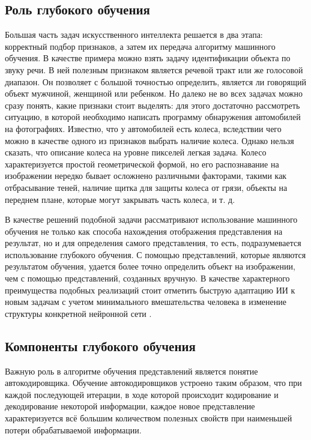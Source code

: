 \documentclass[bachelor, och, coursework]{SCWorks}
\begin{document}
    \subsection{Роль глубокого обучения}

        Большая часть задач искусственного интеллекта решается в два этапа: корректный подбор признаков, а затем их передача алгоритму машинного обучения. В качестве примера можно взять задачу идентификации объекта по звуку речи. В ней полезным признаком является речевой тракт или же голосовой диапазон. Он
        позволяет с большой точностью определить, является ли говорящий объект мужчиной, женщиной или
        ребенком.
        Но далеко не во всех задачах можно сразу понять, какие признаки стоит выделять: для этого достаточно рассмотреть ситуацию, в которой необходимо написать программу обнаружения автомобилей на фотографиях. Известно, что у автомобилей есть колеса, вследствии чего можно в качестве одного из признаков выбрать наличие колеса. Однако нельзя сказать, что описание колеса на уровне пикселей легкая задача.
        Колесо характеризуется простой геометрической формой, но его распознавание на изображении
        нередко бывает осложнено различными факторами, такими как отбрасывание теней, наличие щитка для защиты колеса от грязи, объекты на переднем плане, которые могут закрывать часть колеса, и т. д.

        В качестве решений подобной задачи рассматривают использование машинного обучения не только как способа нахождения отображения представления на результат, но и для определения самого представления, то есть, подразумевается использование глубокого обучения. С помощью представлений, которые являются результатом обучения, удается более точно определить объект на изображении, чем с помощью представлений, созданных вручную. В качестве характерного преимущества подобных реализаций стоит отметить быструю адаптацию ИИ к новым задачам с учетом минимального вмешательства человека в изменение структуры конкретной нейронной сети \cite{Gud}.

    \subsection{Компоненты глубокого обучения}

        Важную роль в алгоритме обучения представлений является понятие автокодировщика. Обучение автокодировщиков устроено таким образом, что при каждой последующей итерации, в ходе которой происходит кодирование и декодирование некоторой информации, каждое новое представление характеризуется всё большим количеством полезных свойств при наименьшей потери обрабатываемой информации.
\end{document}
